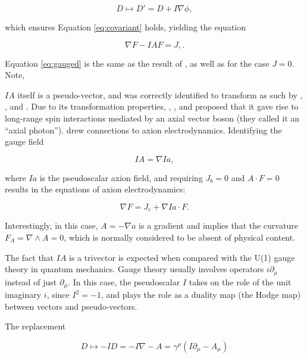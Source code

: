 \documentclass{article}
\begin{document}
  \begin{equation}
    D \mapsto D' = D + I \nabla \phi,
  \end{equation}

  which ensures Equation \ref{eq:covariant} holds, yielding the equation

  \begin{equation}
    \nabla F - I A F = J,\label{eq:gauged}.
  \end{equation}

  Equation \ref{eq:gauged} is the same as the result of \cite{tiwari}, as well as \cite{malik} for the case $J=0$. Note, 

  $IA$ itself is a pseudo-vector, and was correctly identified to transform as such by \cite{tiwari} , \cite{naik}, and \cite{malik}. Due to its transformation properties, \cite{naik}, \cite{malik}, and \cite{pmn} proposed that it gave rise to long-range spin interactions mediated by an axial vector boson (they called it an ``axial photon''). \cite{tiwari}  drew connections to axion electrodynamics. Identifying the gauge field

  \begin{equation}
    IA = \nabla I a,
  \end{equation}

  where $Ia$ is the pseudoscalar axion field, and requiring $J_b = 0$ and $A \cdot F = 0$ results in the equations of axion electrodynamics:

  \begin{equation}
    \nabla F = J_e + \nabla I a \cdot F.
  \end{equation}

  Interestingly, in this case, $A = -\nabla a$ is a gradient and implies that the curvature $F_A = \nabla \wedge A = 0$, which is normally considered to be absent of physical content.

  The fact that $IA$ is a trivector is expected when compared with the U(1) gauge theory in quantum mechanics. Gauge theory usually involves operators $i \partial_\mu$ instead of just $\partial_\mu$. In this case, the pseudoscalar $I$ takes on the role of the unit imaginary $i$, since $I^2 = -1$, and plays the role as a duality map (the Hodge map) between vectors and pseudo-vectors.

  The replacement 

  \begin{equation}
    D \mapsto - I D = -I \nabla - A = \gamma^\mu (I \partial_\mu - A_\mu)
  \end{equation}
\end{document}
